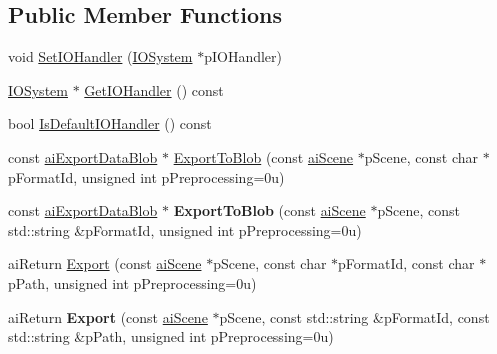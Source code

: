 \subsection*{\-Public \-Member \-Functions}
\begin{DoxyCompactItemize}
\item 
void \hyperlink{classAssimp_1_1Exporter_a054201cf78fa352b1281ea8b484f6e3a}{\-Set\-I\-O\-Handler} (\hyperlink{classAssimp_1_1IOSystem}{\-I\-O\-System} $\ast$p\-I\-O\-Handler)
\item 
\hyperlink{classAssimp_1_1IOSystem}{\-I\-O\-System} $\ast$ \hyperlink{classAssimp_1_1Exporter_a736d66db1a94de7df6eb978975e8d47a}{\-Get\-I\-O\-Handler} () const 
\item 
bool \hyperlink{classAssimp_1_1Exporter_a9ae1196f04cceb0d35fde6229ba41d0b}{\-Is\-Default\-I\-O\-Handler} () const 
\item 
const \hyperlink{structaiExportDataBlob}{ai\-Export\-Data\-Blob} $\ast$ \hyperlink{classAssimp_1_1Exporter_a390c0950a3a164fc431e0797ae1a84d1}{\-Export\-To\-Blob} (const \hyperlink{structaiScene}{ai\-Scene} $\ast$p\-Scene, const char $\ast$p\-Format\-Id, unsigned int p\-Preprocessing=0u)
\item 
\hypertarget{classAssimp_1_1Exporter_a02aa8c453879dc9365e7ec4d1e8d7413}{const \hyperlink{structaiExportDataBlob}{ai\-Export\-Data\-Blob} $\ast$ {\bfseries \-Export\-To\-Blob} (const \hyperlink{structaiScene}{ai\-Scene} $\ast$p\-Scene, const std\-::string \&p\-Format\-Id, unsigned int p\-Preprocessing=0u)}\label{classAssimp_1_1Exporter_a02aa8c453879dc9365e7ec4d1e8d7413}

\item 
ai\-Return \hyperlink{classAssimp_1_1Exporter_ab8edf249172567a78ca302278a415e35}{\-Export} (const \hyperlink{structaiScene}{ai\-Scene} $\ast$p\-Scene, const char $\ast$p\-Format\-Id, const char $\ast$p\-Path, unsigned int p\-Preprocessing=0u)
\item 
\hypertarget{classAssimp_1_1Exporter_aec681d38ca0bef85a015c64831a3566a}{ai\-Return {\bfseries \-Export} (const \hyperlink{structaiScene}{ai\-Scene} $\ast$p\-Scene, const std\-::string \&p\-Format\-Id, const std\-::string \&p\-Path, unsigned int p\-Preprocessing=0u)}\label{classAssimp_1_1Exporter_aec681d38ca0bef85a015c64831a3566a}


\end{DoxyCompactItemize}
